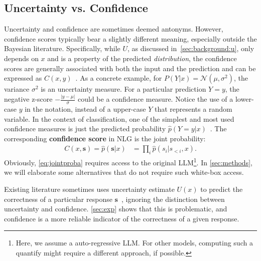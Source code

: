\subsection{Uncertainty vs. Confidence}\label{sec:background:uvsc}
Uncertainty and confidence are sometimes deemed antonyms. 
However, confidence scores typically bear a slightly different meaning, especially outside the Bayesian literature. 
Specifically, while $U$, as discussed in~\cref{sec:background:u}, only depends on $x$ and is a property of the predicted \textit{distribution}, the confidence scores are generally associated with both the input and the prediction and can be expressed as $C(x, y)$~\citep{Chow1970OnTradeoff,Corbiere2019AddressingConfidence,Jiang2018ToClassifier,lin2022scrib}.
As a concrete example, for $P(Y|x) = \mathcal{N}(\mu, \sigma^2)$, the variance $\sigma^2$ is an uncertainty measure.
For a particular prediction $Y=y$, the negative z-score $-\frac{|y-\mu|}{\sigma}$ could be a confidence measure.
Notice the use of a lower-case $y$ in the notation, instead of a upper-case $Y$ that represents a random variable.
In the context of classification, one of the simplest and most used confidence measures is just the predicted probability $\hat{p}(Y=y|x)$~\citep{Geifman2017SelectiveNetworks, hendrycks2017a}.
The corresponding {\bf confidence score} in NLG is the joint probability:
\vspace{-1mm}
\begin{align}
    C(x,\mathbf{s}) = \hat{p}(\mathbf{s}|x) &= \prod_{i} \hat{p}(s_i | s_{<i}, x). \label{eq:jointproba}
\end{align}
Obviously, \cref{eq:jointproba} requires access to the original LLM\footnote{Here, we assume a auto-regressive LLM. For other models, computing such a quantify might require a different approach, if possible.}.
In \cref{sec:methods}, we will elaborate some alternatives that do not require such white-box access.

Existing literature sometimes uses uncertainty estimate $U(x)$ to predict the correctness of a particular response $\mathbf{s}$~\citep{kuhn2023semantic,malinin2021uncertainty}, ignoring the distinction between uncertainty and confidence. 
\cref{sec:exp} shows that this is problematic, and confidence is a more reliable indicator of the correctness of a given response. 
